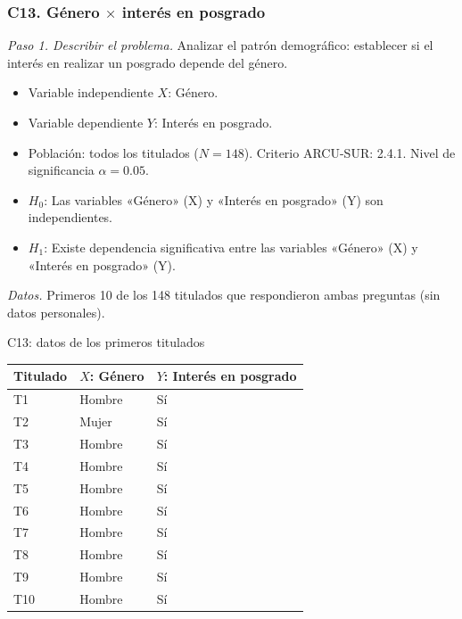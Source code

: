 \subsubsection*{C13. Género $\times$ interés en posgrado}

\textit{Paso 1. Describir el problema.} Analizar el patrón demográfico: establecer si el interés en realizar un posgrado depende del género.

\begin{itemize}[nosep]
  \item Variable independiente $X$: Género.
  \item Variable dependiente $Y$: Interés en posgrado.
  \item Población: todos los titulados ($N = 148$). Criterio ARCU-SUR: 2.4.1. Nivel de significancia $\alpha = 0.05$.
  \item $H_0$: Las variables «Género» (X) y «Interés en posgrado» (Y) son independientes.
  \item $H_1$: Existe dependencia significativa entre las variables «Género» (X) y «Interés en posgrado» (Y).
\end{itemize}

\textit{Datos.} Primeros 10 de los 148 titulados que respondieron ambas preguntas (sin datos personales).

\begin{mitabla}{C13: datos de los primeros titulados}
\begin{tabular}{lll}
\toprule
Titulado & $X$: Género & $Y$: Interés en posgrado \\
\midrule
T1 & Hombre & Sí \\
T2 & Mujer & Sí \\
T3 & Hombre & Sí \\
T4 & Hombre & Sí \\
T5 & Hombre & Sí \\
T6 & Hombre & Sí \\
T7 & Hombre & Sí \\
T8 & Hombre & Sí \\
T9 & Hombre & Sí \\
T10 & Hombre & Sí \\
\bottomrule
\end{tabular}
\end{mitabla}

